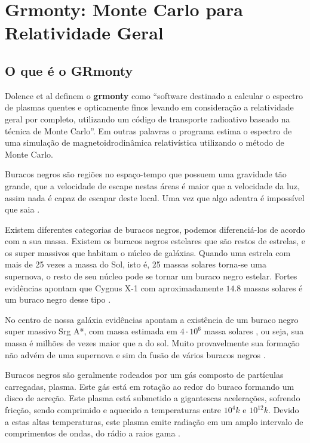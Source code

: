 \chapter{Grmonty: Monte Carlo para Relatividade Geral}
\label{cap:grmonty}

\section{O que é o GRmonty}
  Dolence et al definem o \textbf{grmonty} como ``software destinado a calcular o espectro de plasmas quentes e opticamente finos levando em consideração a relatividade geral por completo, utilizando um código de transporte radioativo baseado na técnica de Monte Carlo''\citep[p.1, traduzido]{Dolence:09}. Em outras palavras o programa estima o espectro de uma simulação de magnetoidrodinâmica \cite{eletro-hidro-dynamic:42} relativística utilizando o método de Monte Carlo.

  Buracos negros são regiões no espaço-tempo que possuem uma gravidade tão grande, que a velocidade de escape nestas áreas é maior que a velocidade da luz, assim nada é capaz de escapar deste local. Uma vez que algo adentra é impossível que saia \cite{fatalgravity:10}.

  Existem diferentes categorias de buracos negros, podemos diferenciá-los de acordo com a sua massa. Existem os buracos negros estelares que são restos de estrelas, e os super massivos que habitam o núcleo de galáxias. Quando uma estrela com mais de 25 vezes a massa do Sol, isto é, 25 massas solares torna-se uma supernova, o resto de seu núcleo pode se tornar um buraco negro estelar. Fortes evidências apontam que Cygnus X-1 com aproximadamente $14.8$ massas solares é um buraco negro desse tipo \cite{cygx1:11}.

  No centro de nossa galáxia evidências apontam a existência de um buraco negro super massivo Srg A*, com massa estimada em $4 \cdot 10^6$ massa solares \cite{2016ApJ...830...17B}, ou seja, sua massa é milhões de vezes maior que a do sol. Muito provavelmente sua formação não advém de uma supernova e sim da fusão de vários buracos negros \cite{fatalgravity:10}.

  Buracos negros são geralmente rodeados por um gás composto de partículas carregadas, plasma. Este gás está em rotação ao redor do buraco formando um disco de acreção. Este plasma está submetido a gigantescas acelerações, sofrendo fricção, sendo comprimido e aquecido a temperaturas entre $10^4k$ e $10^{12}k$. Devido a estas altas temperaturas, este plasma emite radiação em um amplo intervalo de comprimentos de ondas, do rádio a raios gama \cite{1969Natur.223..690L}.
  
